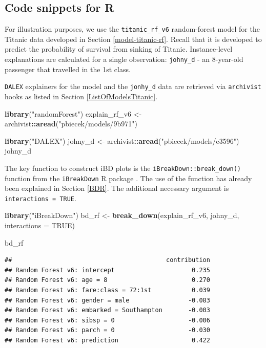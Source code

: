 \documentclass[12pt,]{krantz}
\newenvironment{Shaded}{\begin{snugshade}}{\end{snugshade}}
\newcommand{\DataTypeTok}[1]{\textcolor[rgb]{0.13,0.29,0.53}{#1}}
\newcommand{\KeywordTok}[1]{\textcolor[rgb]{0.13,0.29,0.53}{\textbf{#1}}}
\newcommand{\NormalTok}[1]{#1}
\newcommand{\OperatorTok}[1]{\textcolor[rgb]{0.81,0.36,0.00}{\textbf{#1}}}
\newcommand{\OtherTok}[1]{\textcolor[rgb]{0.56,0.35,0.01}{#1}}
\newcommand{\StringTok}[1]{\textcolor[rgb]{0.31,0.60,0.02}{#1}}
\begin{document}
\hypertarget{iBDRcode}{%
\subsection{Code snippets for R}\label{iBDRcode}}

For illustration purposes, we use the \texttt{titanic\_rf\_v6} random-forest model for the Titanic data developed in Section \ref{model-titanic-rf}. Recall that it is developed to predict the probability of survival from sinking of Titanic. Instance-level explanations are calculated for a single observation: \texttt{johny\_d} - an 8-year-old passenger that travelled in the 1st class.

\texttt{DALEX} explainers for the model and the \texttt{jonhy\_d} data are retrieved via \texttt{archivist} hooks as listed in Section \ref{ListOfModelsTitanic}.

\begin{Shaded}
\begin{Highlighting}[]
\KeywordTok{library}\NormalTok{(}\StringTok{"randomForest"}\NormalTok{)}
\NormalTok{explain_rf_v6 <-}\StringTok{ }\NormalTok{archivist}\OperatorTok{::}\KeywordTok{aread}\NormalTok{(}\StringTok{"pbiecek/models/9b971"}\NormalTok{)}

\KeywordTok{library}\NormalTok{(}\StringTok{"DALEX"}\NormalTok{)}
\NormalTok{johny_d <-}\StringTok{ }\NormalTok{archivist}\OperatorTok{::}\KeywordTok{aread}\NormalTok{(}\StringTok{"pbiecek/models/e3596"}\NormalTok{)}
\NormalTok{johny_d}
\end{Highlighting}
\end{Shaded}

The key function to construct iBD plots is the \texttt{iBreakDown::break\_down()} function from the \texttt{iBreakDown} R package \citep{iBreakDownRPackage}. The use of the function has already been explained in Section \ref{BDR}. The additional necessary argument is \texttt{interactions\ =\ TRUE}.

\begin{Shaded}
\begin{Highlighting}[]
\KeywordTok{library}\NormalTok{(}\StringTok{"iBreakDown"}\NormalTok{)}
\NormalTok{bd_rf <-}\StringTok{ }\KeywordTok{break_down}\NormalTok{(explain_rf_v6, johny_d, }\DataTypeTok{interactions =} \OtherTok{TRUE}\NormalTok{)}

\NormalTok{bd_rf}
\end{Highlighting}
\end{Shaded}

\begin{verbatim}
##                                          contribution
## Random Forest v6: intercept                     0.235
## Random Forest v6: age = 8                       0.270
## Random Forest v6: fare:class = 72:1st           0.039
## Random Forest v6: gender = male                -0.083
## Random Forest v6: embarked = Southampton       -0.003
## Random Forest v6: sibsp = 0                    -0.006
## Random Forest v6: parch = 0                    -0.030
## Random Forest v6: prediction                    0.422
\end{verbatim}
\end{document}
